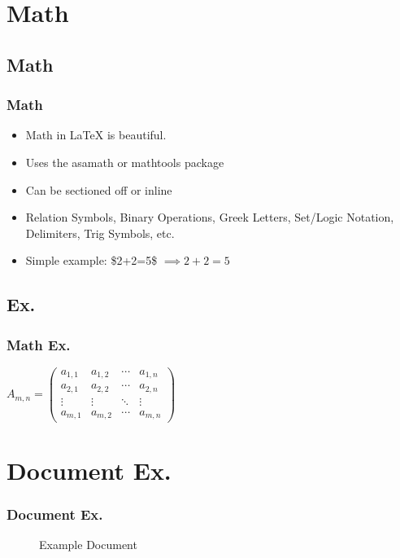 \section{Math}

\subsection{Math}

\begin{frame}
\frametitle{Math}
\begin{itemize}
    \item Math in \LaTeX{} is beautiful.
    \item Uses the asamath or mathtools package
    \item Can be sectioned off or inline
    \item Relation Symbols, Binary Operations, Greek Letters, Set/Logic
        Notation, Delimiters, Trig Symbols, etc.
    \item Simple example: \$2+2=5\$ $\implies 2+2=5$
\end{itemize}
\end{frame}

\subsection{Ex.}

\begin{frame}
\frametitle{Math Ex.}
\begin{math}
A_{m,n} =
 \begin{pmatrix}
  a_{1,1} & a_{1,2} & \cdots & a_{1,n} \\
  a_{2,1} & a_{2,2} & \cdots & a_{2,n} \\
  \vdots  & \vdots  & \ddots & \vdots  \\
  a_{m,1} & a_{m,2} & \cdots & a_{m,n}
 \end{pmatrix}
 \end{math}
\end{frame}

\section{Document Ex.}

\begin{frame}
\frametitle{Document Ex.}
\begin{figure}[DocEx] 
\caption{Example Document}
\end{figure}
\end{frame}
